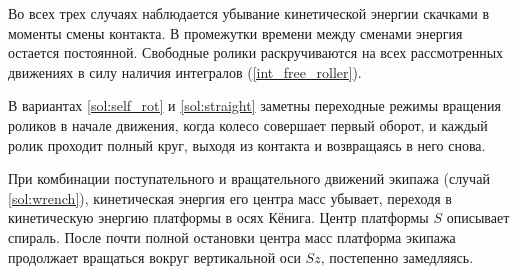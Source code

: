 
Во всех трех случаях наблюдается убывание кинетической энергии скачками в моменты смены контакта. В промежутки времени между сменами энергия остается постоянной.
Свободные ролики раскручиваются на всех рассмотренных движениях в силу наличия интегралов (\ref{int_free_roller}).

В вариантах \ref{sol:self_rot} и \ref{sol:straight} заметны переходные режимы вращения роликов в начале движения, когда колесо совершает первый оборот, и каждый ролик проходит полный круг, выходя из контакта и возвращаясь в него снова.

При комбинации поступательного и вращательного движений экипажа (случай \ref{sol:wrench}), кинетическая энергия его центра масс убывает, переходя в кинетическую энергию платформы в осях Кёнига. Центр платформы $S$ описывает спираль. После почти полной остановки центра масс платформа экипажа продолжает вращаться вокруг вертикальной оси $Sz$, постепенно замедляясь.

